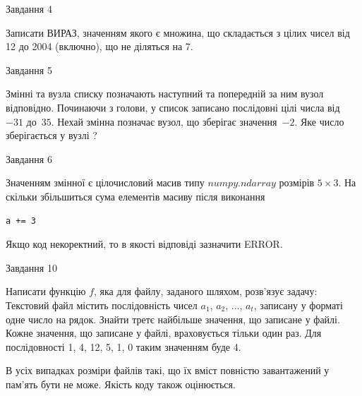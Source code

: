 \documentclass[12pt, ukrainian]{article}
\begin{document}
{               
{\begin{center}Завдання {4}\end{center}}
\vspace{-6mm}
Записати ВИРАЗ, значенням якого є множина, що складається з цілих чисел від 12 до 2004 (включно), що не діляться на 7.\par

\vspace{10mm}
               
{\begin{center}Завдання {5}\end{center}}
\vspace{-6mm}
Змінні  та  вузла списку позначають наступний та попередній за ним вузол відповідно. Починаючи з голови, у список записано послідовні цілі числа від~$-31$ до~$35$. Нехай змінна  позначає вузол, що зберігає значення~$-2$.
Яке число зберігається у вузлі  ?\par

               
{\begin{center}Завдання {6}\end{center}}
\vspace{-6mm}
Значенням змінної  є цілочисловий масив типу $numpy.ndarray$ розмірів $5{\times}3$. На скільки збільшиться сума елементів масиву  після виконання
\begin{verbatim}
a += 3
\end{verbatim}


Якщо код некоректний, то в якості відповіді зазначити ERROR.\par

               
{\begin{center}Завдання {10}\end{center}}
\vspace{-6mm}

Написати функцію $f$, яка для файлу, заданого шляхом, розв’язує задачу:\\ Текстовий файл містить послідовність чисел $a_1$, $a_2$, $\ldots$, $a_t$, записану у форматі одне число на рядок. Знайти третє найбільше значення, що записане у файлі. Кожне значення, що записане у файлі, враховується тільки один раз. Для послідовності 1, 4, 12, 5, 1, 0 таким значенням буде 4.

В усіх випадках розміри файлів такі, що їх вміст повністю завантажений у пам'ять бути не може. Якість коду також оцінюється.



}
\end{document}

